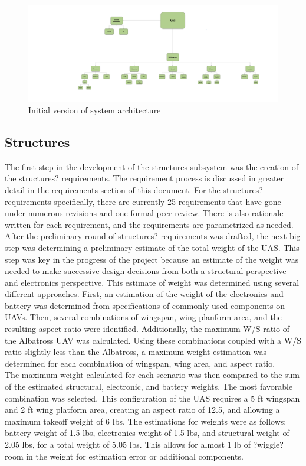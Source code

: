 \documentclass{article}
\begin{document}
\begin{figure}
\includegraphics{UAS_Subsystems.jpg}
\caption{Initial version of system architecture}
\centering
\end{figure}

\subsection{Structures}
\noindent The first step in the development of the structures subsystem was the creation of the structures? requirements. The requirement process is discussed in greater detail in the requirements section of this document. For the structures? requirements specifically, there are currently 25 requirements that have gone under numerous revisions and one formal peer review. There is also rationale written for each requirement, and the requirements are parametrized as needed. \\

\noindent After the preliminary round of structures? requirements was drafted, the next big step was determining a preliminary estimate of the total weight of the UAS. This step was key in the progress of the project because an estimate of the weight was needed to make successive design decisions from both a structural perspective and electronics perspective. This estimate of weight was determined using several different approaches. First, an estimation of the weight of the electronics and battery was determined from specifications of commonly used components on UAVs. Then, several combinations of wingspan, wing planform area, and the resulting aspect ratio were identified. Additionally, the maximum W/S ratio of the Albatross UAV was calculated. Using these combinations coupled with a W/S ratio slightly less than the Albatross, a maximum weight estimation was determined for each combination of wingspan, wing area, and aspect ratio.\\

\noindent The maximum weight calculated for each scenario was then compared to the sum of the estimated structural, electronic, and battery weights. The most favorable combination was selected. This configuration of the UAS requires a 5 ft wingspan and 2 ft wing platform area, creating an aspect ratio of 12.5, and allowing a maximum takeoff weight of 6 lbs. The estimations for weights were as follows: battery weight of 1.5 lbs, electronics weight of 1.5 lbs, and structural weight of 2.05 lbs, for a total weight of 5.05 lbs. This allows for almost 1 lb of ?wiggle? room in the weight for estimation error or additional components. \\
\end{document}

